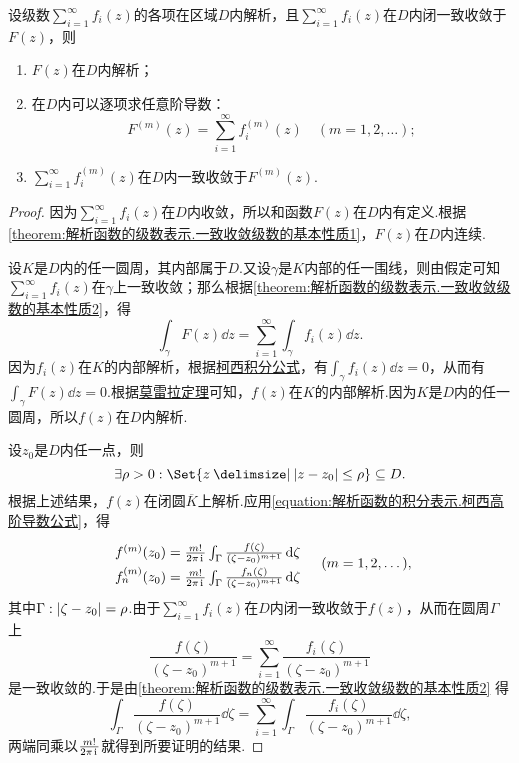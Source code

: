 \begin{theorem}[魏尔斯特拉斯定理]\label{theorem:解析函数的级数表示.魏尔斯特拉斯定理}
设级数\(\sum_{i=1}^\infty f_i(z)\)的各项在区域\(D\)内解析，且\(\sum_{i=1}^\infty f_i(z)\)在\(D\)内闭一致收敛于\(F(z)\)，则\begin{enumerate}
\item \(F(z)\)在\(D\)内解析；
\item 在\(D\)内可以逐项求任意阶导数：\[
F^{(m)}(z) = \sum_{i=1}^\infty f_i^{(m)}(z)
\quad(m=1,2,\dotsc);
\]
\item \(\sum_{i=1}^\infty f_i^{(m)}(z)\)在\(D\)内一致收敛于\(F^{(m)}(z)\).
\end{enumerate}
\begin{proof}
因为\(\sum_{i=1}^\infty f_i(z)\)在\(D\)内收敛，所以和函数\(F(z)\)在\(D\)内有定义.根据\cref{theorem:解析函数的级数表示.一致收敛级数的基本性质1}，\(F(z)\)在\(D\)内连续.

设\(K\)是\(D\)内的任一圆周，其内部属于\(D\).又设\(\gamma\)是\(K\)内部的任一围线，则由假定可知\(\sum_{i=1}^\infty f_i(z)\)在\(\gamma\)上一致收敛；那么根据\cref{theorem:解析函数的级数表示.一致收敛级数的基本性质2}，得\[
\int_{\gamma} F(z) \dd{z} = \sum_{i=1}^\infty \int_{\gamma} f_i(z) \dd{z}.
\]因为\(f_i(z)\)在\(K\)的内部解析，根据\hyperref[equation:解析函数的积分表示.柯西积分公式]{柯西积分公式}，有\(\int_{\gamma} f_i(z) \dd{z} = 0\)，从而有\(\int_{\gamma} F(z) \dd{z} = 0\).根据\hyperref[theorem:解析函数的积分表示.莫雷拉定理]{莫雷拉定理}可知，\(f(z)\)在\(K\)的内部解析.因为\(K\)是\(D\)内的任一圆周，所以\(f(z)\)在\(D\)内解析.

\def\f#1{f\ifx\relax#1\relax\else_{#1}\fi^{(m)}(z_0) = \frac{m!}{2\pi\iu} \int_\Gamma \frac{f\ifx\relax#1\relax\else_{#1}\fi(\zeta)}{(\zeta-z_0)^{m+1}} \dd{\zeta}}
设\(z_0\)是\(D\)内任一点，则\[
\exists \rho > 0 : \Set{ z \given \abs{z-z_0} \leq \rho } \subseteq D.
\]根据上述结果，\(f(z)\)在闭圆\(\overline{K}\)上解析.应用\cref{equation:解析函数的积分表示.柯西高阶导数公式}，得\[
\def\arraystretch{1.5}
\begin{array}{l}
\f{} \\
\f{n}
\end{array}
\quad(m=1,2,\dotsc),
\]其中\(\Gamma: \abs{\zeta-z_0}=\rho\).由于\(\sum_{i=1}^\infty f_i(z)\)在\(D\)内闭一致收敛于\(f(z)\)，从而在圆周\(\Gamma\)上\[
\frac{f(\zeta)}{(\zeta-z_0)^{m+1}}
= \sum_{i=1}^\infty \frac{f_i(\zeta)}{(\zeta-z_0)^{m+1}}
\]是一致收敛的.于是由\cref{theorem:解析函数的级数表示.一致收敛级数的基本性质2} 得\[
\int_\Gamma \frac{f(\zeta)}{(\zeta-z_0)^{m+1}} \dd{\zeta}
= \sum_{i=1}^\infty \int_\Gamma \frac{f_i(\zeta)}{(\zeta-z_0)^{m+1}} \dd{\zeta},
\]两端同乘以\(\frac{m!}{2\pi\kern1pt\mathrm{i}\kern1pt}\)就得到所要证明的结果.
\end{proof}
\end{theorem}

